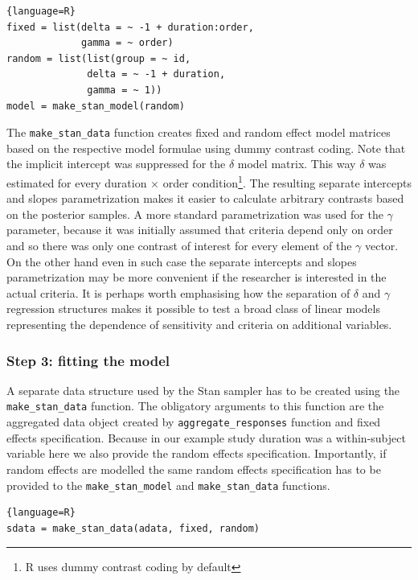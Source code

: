 \documentclass[oneside,a4paper]{article}
\begin{document}
\begin{lstlisting}{language=R}
fixed = list(delta = ~ -1 + duration:order, 
             gamma = ~ order)
random = list(list(group = ~ id, 
              delta = ~ -1 + duration, 
              gamma = ~ 1))
model = make_stan_model(random)
\end{lstlisting}


The \texttt{make\_stan\_data} function creates fixed and random effect
model matrices based on the respective model formulae using dummy
contrast coding. Note that the implicit intercept was suppressed for
the $\delta$ model matrix. This way $\delta$ was estimated for every
duration $\times$ order condition\footnote{R uses dummy contrast
  coding by default}. The resulting separate intercepts and slopes
parametrization makes it easier to calculate arbitrary contrasts based
on the posterior samples. A more standard parametrization was used for
the $\gamma$ parameter, because it was initially assumed that criteria
depend only on order and so there was only one contrast of interest
for every element of the $\gamma$ vector. On the other hand even in
such case the separate intercepts and slopes parametrization may be
more convenient if the researcher is interested in the actual
criteria. It is perhaps worth emphasising how the separation of
$\delta$ and $\gamma$ regression structures makes it possible to test
a broad class of linear models representing the dependence of
sensitivity and criteria on additional variables.

\subsubsection{Step 3: fitting the model}

A separate data structure used by the Stan sampler has to be created
using the \texttt{make\_stan\_data} function. The obligatory arguments
to this function are the aggregated data object created by
\texttt{aggregate\_responses} function and fixed effects
specification. Because in our example study duration was a
within-subject variable here we also provide the random effects
specification. Importantly, if random effects are modelled the same
random effects specification has to be provided to the
\texttt{make\_stan\_model} and \texttt{make\_stan\_data} functions.

\begin{lstlisting}{language=R}
sdata = make_stan_data(adata, fixed, random)
\end{lstlisting}
\end{document}
